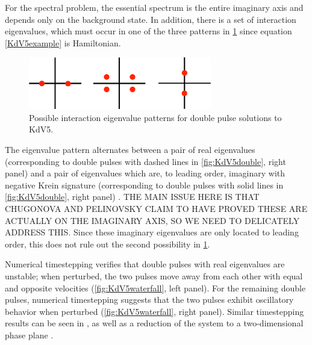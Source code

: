 \documentclass[10pt,reqno]{amsart}
\theoremstyle{plain}
\theoremstyle{definition}
\theoremstyle{remark}
\numberwithin{theorem}{section}
\numberwithin{equation}{section}
\begin{document}
\noi For the spectral problem, the essential spectrum is the entire imaginary axis and depends only on the background state. In addition, there is a set of interaction eigenvalues, which must occur in one of the three patterns in \cref{fig:kdv5inteigpattern} since equation \cref{KdV5example} is Hamiltonian. 
\begin{figure}[H]
\begin{center}
\includegraphics[width=8cm]{images/KdV5eigpattern}
\end{center}
\caption{Possible interaction eigenvalue patterns for double pulse solutions to KdV5.}
\label{fig:kdv5inteigpattern}
\end{figure}
\noi The eigenvalue pattern alternates between a pair of real eigenvalues (corresponding to double pulses with dashed lines in \cref{fig:KdV5double}, right panel) and a pair of eigenvalues which are, to leading order, imaginary with negative Krein signature (corresponding to double pulses with solid lines in \cref{fig:KdV5double}, right panel) \cite[Theorem 2.3]{Pelinovsky2007}. THE MAIN ISSUE HERE IS THAT CHUGONOVA AND PELINOVSKY CLAIM TO HAVE PROVED THESE ARE ACTUALLY ON THE IMAGINARY AXIS, SO WE NEED TO DELICATELY ADDRESS THIS. Since these imaginary eigenvalues are only located to leading order, this does not rule out the second possibility in \cref{fig:kdv5inteigpattern}. 

Numerical timestepping verifies that double pulses with real eigenvalues are unstable; when perturbed, the two pulses move away from each other with equal and opposite velocities (\cref{fig:KdV5waterfall}, left panel). For the remaining double pulses, numerical timestepping suggests that the two pulses exhibit oscillatory behavior when perturbed (\cref{fig:KdV5waterfall}, right panel). Similar timestepping results can be seen in \cite[Figure 9]{Pelinovsky2007}, as well as a reduction of the system to a two-dimensional phase plane \cite[Figure 10]{Pelinovsky2007}.
\end{document}
